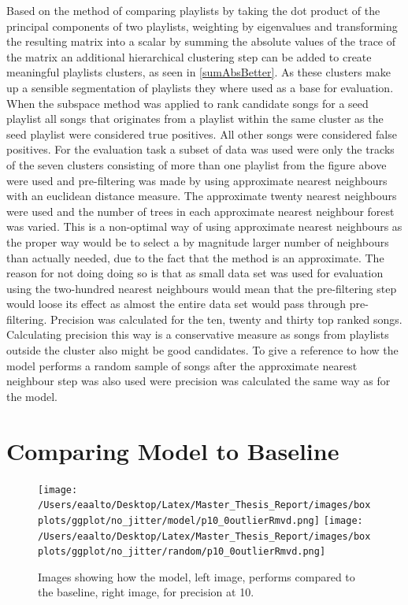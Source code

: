 \documentclass[a4paper,11pt]{kth-mag}
\begin{document}
Based on the method of comparing playlists by taking the dot product of the principal components of two playlists, weighting by eigenvalues and transforming the resulting matrix into a scalar by summing the absolute values of the trace of the matrix an additional hierarchical clustering step can be added to create meaningful playlists clusters, as seen in \ref{sumAbsBetter}. As these clusters make up a sensible segmentation of playlists they where used as a base for evaluation. When the subspace method was applied to rank candidate songs for a seed playlist all songs that originates from a playlist within the same cluster as the seed playlist were considered true positives. All other songs were considered false positives. For the evaluation task a subset of data was used were only the tracks of the seven clusters consisting of more than one playlist from the figure above were used and pre-filtering was made by using approximate nearest neighbours with an euclidean distance measure. The approximate twenty nearest neighbours were used and the number of trees in each approximate nearest neighbour forest was varied. This is a non-optimal way of using approximate nearest neighbours as the proper way would be to select a by magnitude larger number of neighbours than actually needed, due to the fact that the method is an approximate. The reason for not doing doing so is that as small data set was used for evaluation using the two-hundred nearest neighbours would mean that the pre-filtering step would loose its effect as almost the entire data set would pass through pre-filtering. 
Precision was calculated for the ten, twenty and thirty top ranked songs. Calculating precision this way is a conservative measure as songs from playlists outside the cluster also might be good candidates. 
To give a reference to how the model performs a random sample of songs after the approximate nearest neighbour step was also used were precision was calculated the same way as for the model.

\section{Comparing Model to Baseline}

\begin{figure}
\texttt{[image: /Users/eaalto/Desktop/Latex/Master\_Thesis\_Report/images/boxplots/ggplot/no\_jitter/model/p10\_0outlierRmvd.png]}
\texttt{[image: /Users/eaalto/Desktop/Latex/Master\_Thesis\_Report/images/boxplots/ggplot/no\_jitter/random/p10\_0outlierRmvd.png]}

\caption{Images showing how the model, left image, performs compared to the baseline, right image, for precision at 10.}
\end{figure}
\end{document}
